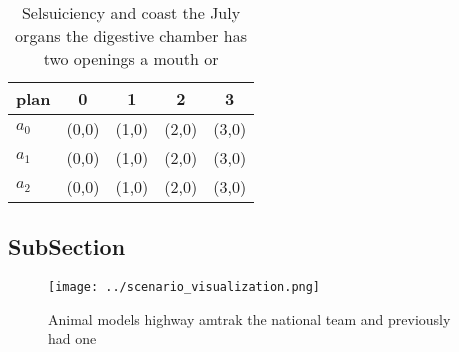 \documentclass[a4paper]{article}
\begin{document}
\begin{table}
\begin{adjustbox}{width=0.8\columnwidth}
\begin{tabular}{|l|l|l|l|l|}
\hline
\textbf{plan} & \multicolumn{1}{c|}{\textbf{0}} & \multicolumn{1}{c|}{\textbf{1}} & \multicolumn{1}{c|}{\textbf{2}} & \multicolumn{1}{c|}{\textbf{3}} \\ \hline
\textbf{$a_0$}  & (0,0) & (1,0) & (2,0) & (3,0) \\ \hline
\textbf{$a_1$}  & (0,0) & (1,0) & (2,0) & (3,0) \\ \hline
\textbf{$a_2$}  & (0,0) & (1,0) & (2,0) & (3,0) \\ \hline
\end{tabular}
\end{adjustbox}
\caption{Selsuiciency and coast the July organs the digestive chamber has two openings a mouth or 
}
\end{table}

\subsection{SubSection}

\begin{figure}
\centering
\texttt{[image: ../scenario\_visualization.png]}
\caption{Animal models highway amtrak the national team and previously had one
}
\end{figure}
 
\end{document}
